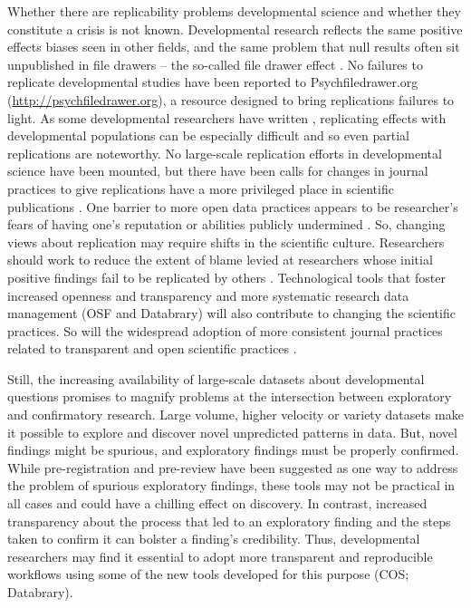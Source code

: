\documentclass[letterpaper,man,apacite]{apa6}
\begin{document}
Whether there are replicability problems developmental science and whether they constitute a crisis is not known.
Developmental research reflects the same positive effects biases seen in other fields, and the same problem that null results often sit unpublished in file drawers -- the so-called file drawer effect \cite{rosenthal_file_1979}.
No failures to replicate developmental studies have been reported to Psychfiledrawer.org (\url{http://psychfiledrawer.org}), a resource designed to bring replications failures to light.
As some developmental researchers have written \cite{bishop-blog-2012}, replicating effects with developmental populations can be especially difficult and so even partial replications are noteworthy.
No large-scale replication efforts in developmental science have been mounted, but there have been calls for changes in journal practices to give replications have a more privileged place in scientific publications \cite{bishop-blog-2012}.
One barrier to more open data practices appears to be researcher's fears of having one's reputation or abilities publicly undermined \cite{ascoli_ups_2006}.
So, changing views about replication may require shifts in the scientific culture.
Researchers should work to reduce the extent of blame levied at researchers whose initial positive findings fail to be replicated by others \cite{bishop-blog-2015}.
Technological tools that foster increased openness and transparency and more systematic research data management (OSF and Databrary) will also contribute to changing the scientific practices.
So will the widespread adoption of more consistent journal practices related to transparent and open scientific practices \cite{nosek_promoting_2015}.

Still, the increasing availability of large-scale datasets about developmental questions promises to magnify problems at the intersection between exploratory and confirmatory research.
Large volume, higher velocity or variety datasets make it possible to explore and discover novel unpredicted patterns in data.
But, novel findings might be spurious, and exploratory findings must be properly confirmed.
While pre-registration and pre-review have been suggested as one way to address the problem of spurious exploratory findings, these tools may not be practical in all cases and could have a chilling effect on discovery.
In contrast, increased transparency about the process that led to an exploratory finding and the steps taken to confirm it can bolster a finding's credibility.
Thus, developmental researchers may find it essential to adopt more transparent and reproducible workflows using some of the new tools developed for this purpose (COS; Databrary).
\end{document}
